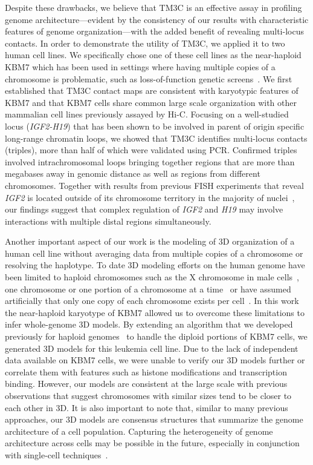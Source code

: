 Despite these drawbacks, we believe that TM3C is an effective
assay in profiling genome architecture---evident by the consistency
of our results with characteristic features of genome organization---with the
added benefit of revealing multi-locus contacts. In order to
demonstrate the utility of TM3C, we applied it to two human cell lines.
We specifically chose one of these cell lines as the near-haploid KBM7
which has been used in settings where having multiple copies of a
chromosome is problematic, such as loss-of-function genetic
screens~\citep{carette:haploid,burckstummer:reversible}. We first established that TM3C
contact maps are consistent with karyotypic features of KBM7 and
that KBM7 cells share common large scale organization with other
mammalian cell lines previously assayed by Hi-C. Focusing on
a well-studied locus (\emph{IGF2-H19}) that has been shown to be involved
in parent of origin specific long-range chromatin loops, we showed
that TM3C identifies multi-locus contacts (triples), more than half
of which were validated using PCR. Confirmed triples
involved intrachromosomal loops bringing together regions that
are more than megabases away in genomic distance as well as regions
from different chromosomes. Together with results from previous
FISH experiments that reveal \emph{IGF2} is located outside of
its chromosome territory in the majority of nuclei~\citep{mahy:gene},
our findings suggest that complex regulation of \emph{IGF2} and
\emph{H19} may involve interactions with multiple distal regions
simultaneously.

Another important aspect of our work is the modeling of 3D
organization of a human cell line without averaging data from
multiple copies of a chromosome or resolving the haplotype.
To date 3D modeling efforts on the human genome have been limited to
haploid chromosomes such as the X chromosome in male
cells~\citep{nagano:single-cell}, one chromosome or one portion of a
chromosome at a time~\citep{nagano:single-cell, bau:three-dimensional}
or have assumed artificially that only one copy of each chromosome
exists per cell~\citep{zhang:inference}.
In this work the near-haploid karyotype of KBM7 allowed us to
overcome these limitations
to infer whole-genome 3D models. By extending an algorithm that we developed
previously for haploid genomes~\citep{varoquaux:statistical} to handle the diploid
portions of KBM7 cells, we generated 3D models for this leukemia
cell line. Due to the lack of independent data available on KBM7 cells, we were unable
to verify our 3D models further or correlate them with features such
as histone modifications and transcription binding. However, our models
are consistent at the large scale with previous observations that
suggest chromosomes with similar sizes tend to be closer to each
other in 3D. It is also important to note that, similar to many previous approaches,
our 3D models are consensus structures that summarize the genome architecture of a
cell population. Capturing the heterogeneity of genome architecture across cells may be
possible in the future, especially in conjunction with single-cell techniques~\citep{nagano:single-cell}.

